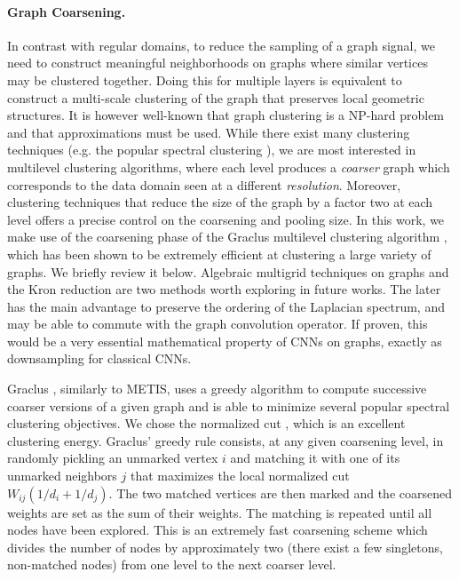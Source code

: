 \documentclass{article}
\newcommand{\todo}[1]{{\color{red} #1 }}
\begin{document}
\paragraph{Graph Coarsening.} In contrast with regular domains, to reduce the
sampling of a graph signal, we need to construct meaningful neighborhoods on
graphs where similar vertices may be clustered together. Doing this for multiple
layers is equivalent to construct a multi-scale clustering of the graph that
preserves local geometric structures. It is however well-known that graph
clustering is a NP-hard problem \cite{art:BuiJonesGraphPartNPhard} and that
approximations must be used. While there exist many clustering techniques (e.g.
the popular spectral clustering \cite{art:VonLuxburg07Tutorial}), we are most
interested in multilevel clustering algorithms, where each level produces a
\textit{coarser} graph which corresponds to the data domain seen at a different
\textit{resolution}. Moreover, clustering techniques that reduce the size of the
graph by a factor two at each level offers a precise control on the coarsening
and pooling size. In this work, we make use of the coarsening phase of the
Graclus multilevel clustering algorithm \cite{art:DhillonGuanKulis07Graclus},
which has been shown to be extremely efficient at clustering a large variety of
graphs. We briefly review it below. Algebraic multigrid techniques on graphs
\cite{art:RonSafroBrandt11MultigridGraph} and the Kron reduction
\cite{art:ShumanFarajiVandergheynst16PyramTrans} are two methods worth exploring
in future works. The later has the main advantage to preserve the ordering of
the Laplacian spectrum, and may be able to commute with the graph convolution
operator. \todo{If proven, this would be a very essential mathematical property
of CNNs on graphs, exactly as downsampling for classical CNNs.}

Graclus \cite{art:DhillonGuanKulis07Graclus}, similarly to METIS, uses a greedy
algorithm to compute successive coarser versions of a given graph and is able to
minimize several popular spectral clustering objectives. We chose the normalized
cut \cite{art:ShiMalik00NCut}, which is an excellent clustering energy.
Graclus' greedy rule consists, at any given coarsening level, in randomly
pickling an unmarked vertex $i$ and matching it with one of its unmarked
neighbors $j$ that maximizes the local normalized cut $W_{ij} (1/d_i + 1/d_j)$.
The two matched vertices are then marked and the coarsened weights are set as
the sum of their weights. The matching is repeated until all nodes have been
explored. This is an extremely fast coarsening scheme which divides the number
of nodes by approximately two (there exist a few singletons, non-matched nodes)
from one level to the next coarser level.
\end{document}

